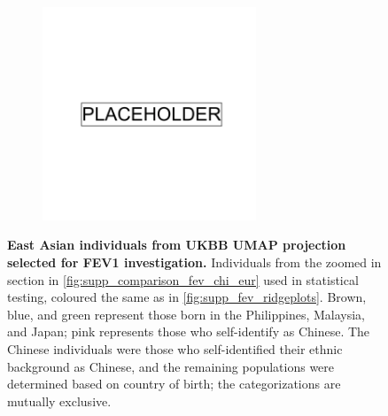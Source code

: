 \begin{figure}
    \centering
    \begin{subfigure}{0.5\textwidth}
    \includegraphics[width=0.7\textwidth]{placeholder.png}
    \end{subfigure}
    \caption[East Asian individuals from UKBB UMAP projection selected for FEV1 investigation]{\textbf{East Asian individuals from UKBB UMAP projection selected for FEV1 investigation.} Individuals from the zoomed in section in \ref{fig:supp_comparison_fev_chi_eur} used in statistical testing, coloured the same as in \ref{fig:supp_fev_ridgeplots}. Brown, blue, and green represent those born in the Philippines, Malaysia, and Japan; pink represents those who self-identify as Chinese. The Chinese individuals were those who self-identified their ethnic background as Chinese, and the remaining populations were determined based on country of birth; the categorizations are mutually exclusive.}
    \label{fig:supp_fev_test_pops}
\end{figure}

\newpage

